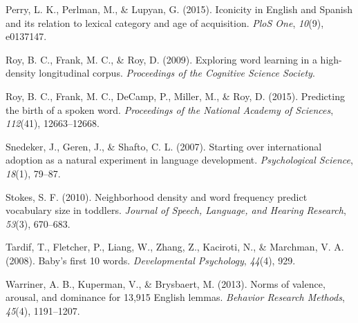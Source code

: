 \documentclass[10pt, letterpaper]{article}
\begin{document}
Perry, L. K., Perlman, M., \& Lupyan, G. (2015). Iconicity in English
and Spanish and its relation to lexical category and age of acquisition.
\emph{PloS One}, \emph{10}(9), e0137147.

Roy, B. C., Frank, M. C., \& Roy, D. (2009). Exploring word learning in
a high-density longitudinal corpus. \emph{Proceedings of the Cognitive
Science Society}.

Roy, B. C., Frank, M. C., DeCamp, P., Miller, M., \& Roy, D. (2015).
Predicting the birth of a spoken word. \emph{Proceedings of the National
Academy of Sciences}, \emph{112}(41), 12663--12668.

Snedeker, J., Geren, J., \& Shafto, C. L. (2007). Starting over
international adoption as a natural experiment in language development.
\emph{Psychological Science}, \emph{18}(1), 79--87.

Stokes, S. F. (2010). Neighborhood density and word frequency predict
vocabulary size in toddlers. \emph{Journal of Speech, Language, and
Hearing Research}, \emph{53}(3), 670--683.

Tardif, T., Fletcher, P., Liang, W., Zhang, Z., Kaciroti, N., \&
Marchman, V. A. (2008). Baby's first 10 words. \emph{Developmental
Psychology}, \emph{44}(4), 929.

Warriner, A. B., Kuperman, V., \& Brysbaert, M. (2013). Norms of
valence, arousal, and dominance for 13,915 English lemmas.
\emph{Behavior Research Methods}, \emph{45}(4), 1191--1207.
\end{document}
